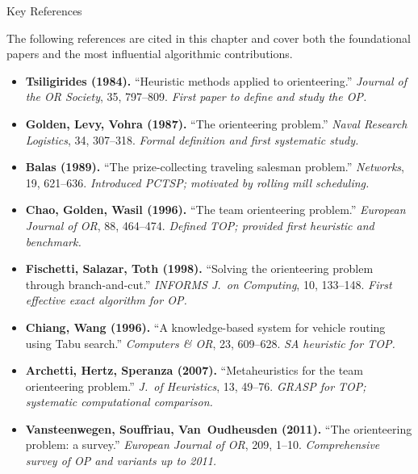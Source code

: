 \documentclass[aspectratio=169,10pt]{beamer}
\begin{document}
\begin{frame}[allowframebreaks]{Key References}

  The following references are cited in this chapter and cover both the
  foundational papers and the most influential algorithmic contributions.

  \medskip
  \begin{itemize}\footnotesize
    \item \textbf{Tsiligirides (1984).}
          ``Heuristic methods applied to orienteering.''
          \emph{Journal of the OR Society}, 35, 797--809.
          \textit{First paper to define and study the OP.}

    \item \textbf{Golden, Levy, Vohra (1987).}
          ``The orienteering problem.''
          \emph{Naval Research Logistics}, 34, 307--318.
          \textit{Formal definition and first systematic study.}

    \item \textbf{Balas (1989).}
          ``The prize-collecting traveling salesman problem.''
          \emph{Networks}, 19, 621--636.
          \textit{Introduced PCTSP; motivated by rolling mill scheduling.}

    \item \textbf{Chao, Golden, Wasil (1996).}
          ``The team orienteering problem.''
          \emph{European Journal of OR}, 88, 464--474.
          \textit{Defined TOP; provided first heuristic and benchmark.}

    \item \textbf{Fischetti, Salazar, Toth (1998).}
          ``Solving the orienteering problem through branch-and-cut.''
          \emph{INFORMS J.\ on Computing}, 10, 133--148.
          \textit{First effective exact algorithm for OP.}

    \item \textbf{Chiang, Wang (1996).}
          ``A knowledge-based system for vehicle routing using Tabu search.''
          \emph{Computers \& OR}, 23, 609--628.
          \textit{SA heuristic for TOP.}

    \item \textbf{Archetti, Hertz, Speranza (2007).}
          ``Metaheuristics for the team orienteering problem.''
          \emph{J.\ of Heuristics}, 13, 49--76.
          \textit{GRASP for TOP; systematic computational comparison.}

    \item \textbf{Vansteenwegen, Souffriau, Van~Oudheusden (2011).}
          ``The orienteering problem: a survey.''
          \emph{European Journal of OR}, 209, 1--10.
          \textit{Comprehensive survey of OP and variants up to 2011.}


\end{itemize}
\end{frame}
\end{document}
